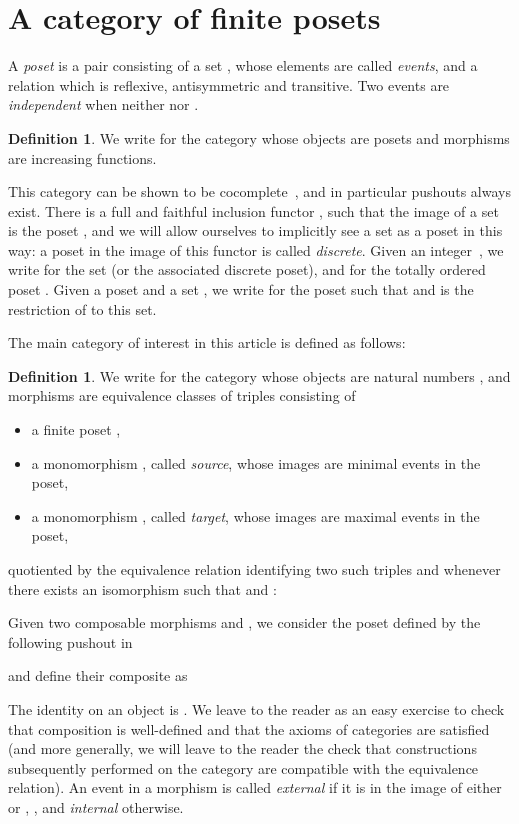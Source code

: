 \documentclass[submission,copyright,creativecommons]{eptcs}
\theoremstyle{definition}
\newtheorem{definition}[theorem]{Definition}
\theoremstyle{remark}
\begin{document}
\section{A category of finite posets}
\label{sec:finpos}
A \emph{poset} is a pair  consisting of a set
, whose elements are called \emph{events}, and a relation
 which is reflexive, antisymmetric
and transitive. Two events  are \emph{independent} when
neither  nor .

\begin{definition}
  We write  for the category whose objects are posets and morphisms are
  increasing functions.
\end{definition}

\noindent
This category can be shown to be cocomplete~\cite{adamek1994locally}, and in
particular pushouts always exist. There is a full and faithful inclusion functor
, such that the image of a set  is the poset , and we
will allow ourselves to implicitly see a set as a poset in this way: a poset in
the image of this functor is called \emph{discrete}. Given an integer~,
we write  for the set  (or the associated
discrete poset), and  for the totally ordered poset
. Given a poset  and a set , we
write  for the poset such that  and  is the restriction of  to this
set.

The main category of interest in this article is defined as follows:

\begin{definition}
  We write  for the category whose objects are natural numbers , and
  morphisms  are equivalence classes of triples
  consisting of
  \begin{itemize}
  \item a finite poset ,
  \item a monomorphism , called \emph{source}, whose images are
    minimal events in the poset,
  \item a monomorphism , called \emph{target}, whose images are
    maximal events in the poset,
  \end{itemize}
  quotiented by the equivalence relation identifying two such triples 
  and  whenever there exists an isomorphism  such that
   and :
  
  Given two composable morphisms  and , we
  consider the poset  defined by the following pushout in 
  
  and define their composite as
  
  The identity on an object  is . We leave to the
  reader as an easy exercise to check that composition is well-defined and that
  the axioms of categories are satisfied (and more generally, we will leave to
  the reader the check that constructions subsequently performed on the category
  are compatible with the equivalence relation). An event  in a
  morphism  is called \emph{external} if it is in the image of
  either  or , \ie , and \emph{internal}
  otherwise.
\end{definition}
\end{document}
